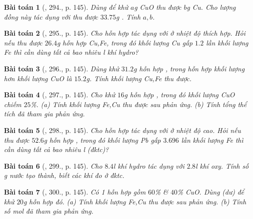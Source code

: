 \documentclass{article}
\newtheorem{baitoan}{Bài toán}
\begin{document}
\begin{baitoan}[\cite{An_400_BT_Hoa_Hoc_8_2020}, 294., p. 145]
	Dùng \emph{} để khử $a$\emph{g} \emph{CuO} thu được $b$\emph{g} \emph{Cu}. Cho lượng đồng này tác dụng với \emph{} thu được $33.75$\emph{g} \emph{}. Tính $a,b$.
\end{baitoan}

\begin{baitoan}[\cite{An_400_BT_Hoa_Hoc_8_2020}, 295., p. 145]
	Cho hỗn hợp \emph{} tác dụng với \emph{} ở nhiệt độ thích hợp. Hỏi nếu thu được $26.4$\emph{g} hỗn hợp \emph{Cu,Fe}, trong đó khối lượng \emph{Cu} gấp $1.2$ lần khối lượng \emph{Fe} thì cần dùng tất cả bao nhiêu \emph{l} khí hydro?
\end{baitoan}

\begin{baitoan}[\cite{An_400_BT_Hoa_Hoc_8_2020}, 296., p. 145]
	Dùng \emph{} khử $31.2$\emph{g} hỗn hợp \emph{}, trong hỗn hợp khối lượng \emph{} hơn khối lượng \emph{CuO} là $15.2$\emph{g}. Tính khối lượng \emph{Cu,Fe} thu được.
\end{baitoan}

\begin{baitoan}[\cite{An_400_BT_Hoa_Hoc_8_2020}, 297., p. 145]
	Cho \emph{} khử $16$\emph{g} hỗn hợp \emph{}, trong đó khối lượng \emph{CuO} chiếm $25$\%. (a) Tính khối lượng \emph{Fe,Cu} thu được sau phản ứng. (b) Tính tổng thể tích \emph{} đã tham gia phản ứng.
\end{baitoan}

\begin{baitoan}[\cite{An_400_BT_Hoa_Hoc_8_2020}, 298., p. 145]
	Cho hỗn hợp \emph{} tác dụng với \emph{} ở nhiệt độ cao. Hỏi nếu thu được $52.6$\emph{g} hỗn hợp \emph{}, trong đó khối lượng \emph{Pb} gấp $3.696$ lần khối lượng \emph{Fe} thì cần dùng tất cả bao nhiêu \emph{l} \emph{} (đktc)?
\end{baitoan}

\begin{baitoan}[\cite{An_400_BT_Hoa_Hoc_8_2020}, 299., p. 145]
	Cho $8.4$\emph{l} khí hydro tác dụng với $2.8$\emph{l} khí oxy. Tính số \emph{g} nước tạo thành, biết các khí đo ở đktc.
\end{baitoan}

\begin{baitoan}[\cite{An_400_BT_Hoa_Hoc_8_2020}, 300., p. 145]
	Có 1 hỗn hợp gồm $60$\% \emph{} \& $40$\% \emph{CuO}. Dùng \emph{} (dư) để khử $20$\emph{g} hỗn hợp đó. (a) Tính khối lượng \emph{Fe,Cu} thu được sau phản ứng. (b) Tính số mol \emph{} đã tham gia phản ứng.
\end{baitoan}
\end{document}
